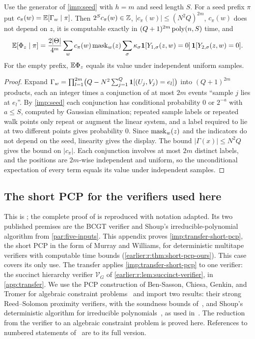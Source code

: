 \begin{corollary}\label{cor:conditional}
Use the generator of \cref{imp:seed} with \(h=m\) and seed length
\(S\). For a seed prefix \(\pi\) put \(c_\pi(w)=\mathbb E[\Gamma_w\mid\pi]\).
Then \(2^Sc_\pi(w)\in\mathbb Z\), \(|c_\pi(w)|\le(N^2Q)^{2m}\), \(c_\pi(w)\)
does not depend on \(z\), it is computable exactly in
\((Q+1)^{2m}\operatorname{poly}(n,S)\) time, and
\[
 \mathbb E[\Phi_z\mid\pi]=\frac{2|\Theta|}{4^m}\sum_wc_\pi(w)\,\mathrm{mask}_w(z)\sum_\sigma\kappa_\sigma
 \mathbf 1[Y_{1,\sigma}(z,w)=0]\,\mathbf 1[Y_{2,\sigma}(z,w)=0].
\]
For the empty prefix, \(\mathbb E\Phi_z\) equals its value under independent
uniform samples.
\end{corollary}
\begin{proof}
Expand \(\Gamma_w=\prod_{l=1}^{2m}\bigl(Q-N^2\sum_{j=1}^Q\mathbf 1[(U_j,V_j)=e_l]\bigr)\)
into \((Q+1)^{2m}\) products, each an integer times a conjunction of at
most \(2m\) events ``sample \(j\) lies at \(e_l\)''. By
\cref{imp:seed} each conjunction has conditional probability \(0\) or
\(2^{-a}\) with \(a\le S\), computed by Gaussian elimination; repeated
sample labels or repeated walk points only repeat or augment the
linear system, and a label required to lie at two different points
gives probability \(0\). Since \(\mathrm{mask}_w(z)\) and the indicators do not
depend on the seed, linearity gives the display. The bound
\(|\Gamma(x)|\le N^2Q\) gives the bound on \(|c_\pi|\). Each
conjunction involves at most \(2m\) distinct labels, and the positions
are \(2m\)-wise independent and uniform, so the unconditional
expectation of every term equals its value under independent samples.
\end{proof}

\subsection{The short PCP for the verifiers used here}\label{earlier:r:app:short-pcp-proof}\label{earlier:release-short-pcp}

This is \cite[Appendix~D]{NagCG}; the complete proof of \cite{NagCG} is reproduced with notation adapted.
Its two published premises are the BCGT verifier and Shoup's
irreducible-polynomial algorithm from \cref{par:five-inputs}. This appendix proves \cref{imp:transfer-short-pcp}, the short PCP in the form of
Murray and Williams, for deterministic multitape verifiers with
computable time bounds (\cref{earlier:r:thm:short-pcp-ours}). This case covers its
only use. The transfer applies \cref{imp:transfer-short-pcp} to one verifier: the
succinct hierarchy verifier \(\mathcal V_G\) of
\cref{earlier:r:lem:succinct-verifier}, in \cref{app:transfer}.
We use the PCP construction of Ben-Sasson, Chiesa, Genkin, and Tromer
for algebraic constraint problems~\cite{BCGT13} and import two
results: their strong Reed--Solomon proximity verifiers, with the
soundness bounds of~\cite[Theorem~11.1]{BCGT13}, and Shoup's deterministic
algorithm for irreducible polynomials~\cite[Corollary~3.2]{Sho88}, as
used in~\cite[Algorithm~17]{BCGT13}. The reduction from the verifier to
an algebraic constraint problem is proved here. References to numbered
statements of~\cite{BCGT13} are to its full version.

